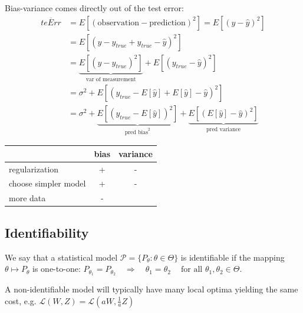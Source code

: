 \documentclass[10pt,a4paper,landscape]{article}
\begin{document}
\begin{multicols*}{4}
Bias-variance comes directly out of the test error:
 \begin{align*}
 \overline{teErr}
 &= E[(\text{observation} - \text{prediction})^2] = E[(y - \hat{y})^2] \\
 &= E[(y - y_{true} + y_{true} - \hat{y})^2] \\
 &=\underbrace{E[(y - y_{true})^2]}_{\text{var of measurement}} + E[(y_{true} - \hat{y})^2] \\
 &=\sigma^2 + E[(y_{true} - E[\hat{y}] + E[\hat{y}] - \hat{y})^2] \\
 &=\sigma^2 + \underbrace{E[(y_{true} - E[\hat{y}])^2]}_{\text{pred bias}^2} +\underbrace{E[(E[\hat{y}] - \hat{y})^2]}_{\text{pred variance}}
\end{align*}

\begin{tabular}{ l || c | c }
                          & bias & variance \\
  \hline
  regularization          & +    & - \\
  choose simpler model    & +    & - \\
  more data               & -    & \\
  \hline
\end{tabular}

\subsection{Identifiability}
We say that a statistical model $\mathcal{P} = \{P_\theta: \theta \in \Theta\}$ is identifiable if the mapping $\theta \mapsto P_\theta$ is one-to-one:
$P_{\theta_1}=P_{\theta_2} \quad\Rightarrow\quad \theta_1=\theta_2 \quad\ \text{for all } \theta_1,\theta_2\in\Theta.$

A non-identifiable model will typically have many local optima yielding the same cost, e.g. $\mathcal{L}(W, Z) = \mathcal{L}(aW, \frac{1}{a} Z)$



\end{multicols*}
\end{document}
